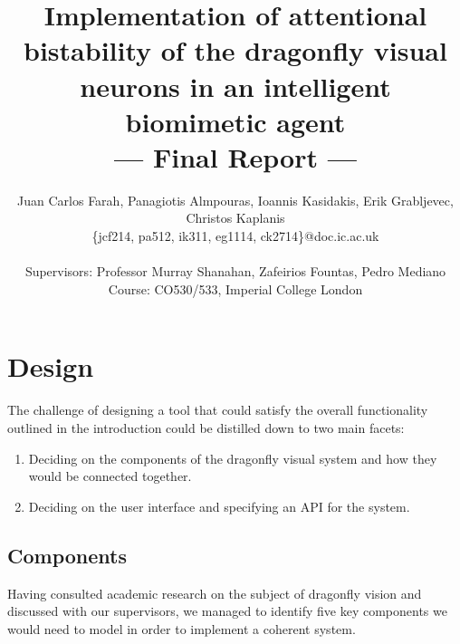 \documentclass[a4paper,11pt]{article}
\title{Implementation of attentional bistability of the dragonfly visual neurons in an intelligent biomimetic agent\\\Large{--- Final Report ---}}
\author{Juan Carlos Farah, Panagiotis Almpouras, Ioannis Kasidakis, Erik Grabljevec, Christos Kaplanis\\
       \{jcf214, pa512, ik311, eg1114, ck2714\}@doc.ic.ac.uk\\ \\
       \small{Supervisors: Professor Murray Shanahan, Zafeirios Fountas, Pedro Mediano}\\
       \small{Course: CO530/533, Imperial College London}
}
\begin{document}
\maketitle

\section{Design}

The challenge of designing a tool that could satisfy the overall functionality outlined in the introduction could be distilled down to two main facets:
\begin{enumerate}
\item Deciding on the components of the dragonfly visual system and how they would be connected together.
\item Deciding on the user interface and specifying an API for the system.
\end{enumerate}

\subsection{Components}

Having consulted academic research on the subject of dragonfly vision and discussed with our supervisors, we managed to identify five key components we would need to model in order to implement a coherent system. 
\end{document}
